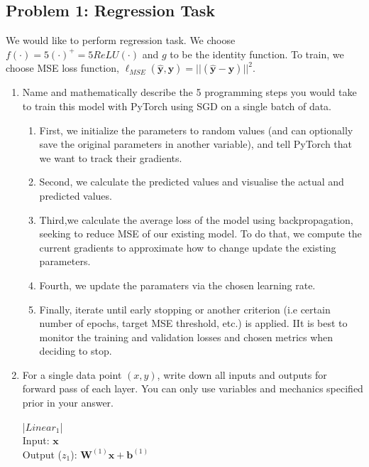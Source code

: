 \documentclass{article}
\begin{document}
\subsection*{Problem 1: Regression Task}
We would like to perform regression task. We choose
$f(\cdot)=5(\cdot)^{+}=5ReLU(\cdot)$ and $g$ to be the identity function. To
train, we choose MSE loss function,
$\ell_{MSE}(\bm{\hat{y}},\bm{y})=||(\bm{\hat{y}}-\bm{y})||^2$.
\begin{enumerate}
  \item Name and mathematically describe the 5 programming steps you
        would take to train this model with PyTorch using SGD on a single batch
        of data.
        \begin{tcolorbox}
          \begin{enumerate}
            \item First, we initialize the parameters to random values (and can
                  optionally save the original parameters in another variable),
                  and tell PyTorch
                  that we want to track their gradients.
            \item Second, we calculate the predicted values and visualise the
                  actual and predicted values.
            \item Third,we calculate the average loss of the model using
                  backpropagation, seeking to reduce MSE of our existing model. To do that, we
                  compute the current gradients to approximate how to change update the existing
                  parameters.
            \item Fourth, we update the paramaters via the chosen learning
                  rate.
            \item Finally, iterate until early stopping or another criterion
                  (i.e certain number of epochs, target MSE threshold, etc.) is applied. IIt is
                  best to monitor the training and validation losses and chosen metrics when
                  deciding to stop.
          \end{enumerate}
        \end{tcolorbox}
  \item For a single data point $(x,y)$, write down all inputs and outputs for
        forward pass of each layer. You can only use variables and mechanics specified
        prior in your answer.
        \begin{tcolorbox}
          |$Linear_1$|\\ Input: $\bm{x}$\\Output ($z_1$): $\bm{W}^{(1)}\bm{x}+\bm{b}^{(1)}$\\

\end{tcolorbox}
\end{enumerate}
\end{document}
